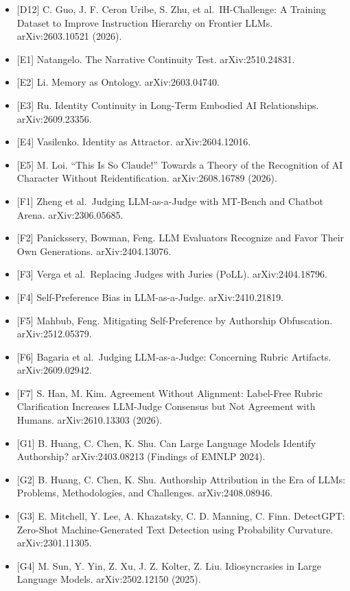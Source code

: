 \documentclass[10pt]{article}
\begin{document}
\begin{itemize}
\item
  {[}D12{]} C. Guo, J. F. Ceron Uribe, S. Zhu, et al.~IH-Challenge: A Training Dataset to Improve Instruction Hierarchy on Frontier LLMs. arXiv:2603.10521 (2026).
\item
  {[}E1{]} Natangelo. The Narrative Continuity Test. arXiv:2510.24831.
\item
  {[}E2{]} Li. Memory as Ontology. arXiv:2603.04740.
\item
  {[}E3{]} Ru. Identity Continuity in Long-Term Embodied AI Relationships. arXiv:2609.23356.
\item
  {[}E4{]} Vasilenko. Identity as Attractor. arXiv:2604.12016.
\item
  {[}E5{]} M. Loi. ``This Is So Claude!'' Towards a Theory of the Recognition of AI Character Without Reidentification. arXiv:2608.16789 (2026).
\item
  {[}F1{]} Zheng et al.~Judging LLM-as-a-Judge with MT-Bench and Chatbot Arena. arXiv:2306.05685.
\item
  {[}F2{]} Panickssery, Bowman, Feng. LLM Evaluators Recognize and Favor Their Own Generations. arXiv:2404.13076.
\item
  {[}F3{]} Verga et al.~Replacing Judges with Juries (PoLL). arXiv:2404.18796.
\item
  {[}F4{]} Self-Preference Bias in LLM-as-a-Judge. arXiv:2410.21819.
\item
  {[}F5{]} Mahbub, Feng. Mitigating Self-Preference by Authorship Obfuscation. arXiv:2512.05379.
\item
  {[}F6{]} Bagaria et al.~Judging LLM-as-a-Judge: Concerning Rubric Artifacts. arXiv:2609.02942.
\item
  {[}F7{]} S. Han, M. Kim. Agreement Without Alignment: Label-Free Rubric Clarification Increases LLM-Judge Consensus but Not Agreement with Humans. arXiv:2610.13303 (2026).
\item
  {[}G1{]} B. Huang, C. Chen, K. Shu. Can Large Language Models Identify Authorship? arXiv:2403.08213 (Findings of EMNLP 2024).
\item
  {[}G2{]} B. Huang, C. Chen, K. Shu. Authorship Attribution in the Era of LLMs: Problems, Methodologies, and Challenges. arXiv:2408.08946.
\item
  {[}G3{]} E. Mitchell, Y. Lee, A. Khazatsky, C. D. Manning, C. Finn. DetectGPT: Zero-Shot Machine-Generated Text Detection using Probability Curvature. arXiv:2301.11305.
\item
  {[}G4{]} M. Sun, Y. Yin, Z. Xu, J. Z. Kolter, Z. Liu. Idiosyncrasies in Large Language Models. arXiv:2502.12150 (2025).

\end{itemize}
\end{document}
